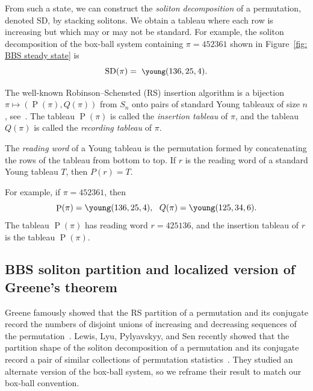 \documentclass[submission]{FPSAC2021}
\theoremstyle{plain}
\theoremstyle{definition}
\numberwithin{equation}{section}
\DeclareMathOperator{\SDself}{SD}
\DeclareMathOperator{\Ptself}{P}
\newcommand{\SD}[1]{\SDself(#1)}
\renewcommand{\P}[1]{\Ptself(#1)}
\begin{document}
From such a state, 
we can construct 
the \emph{soliton decomposition} of a permutation, denoted SD, 
by stacking solitons.
We obtain a tableau where each row is increasing but which may or may not be standard. 
For example, the  soliton decomposition of the box-ball system containing  $\pi=452361$ shown in Figure~\ref{fig: BBS steady state} is \[
{\small  \SD{\pi}=
    ~
    \young(136,25,4)}. 
    \]

\par The well-known Robinson--Schensted (RS) insertion algorithm is 
a bijection \\
${\pi \mapsto (\P{\pi},Q(\pi))}$
from $S_n$ onto pairs of standard Young tableaux of size $n$, see~\cite{Sch61}.
The tableau $\P{\pi}$ is called the \emph{insertion tableau} of $\pi$, and the tableau $Q(\pi)$ is called the \emph{recording tableau} of $\pi$. 

The \emph{reading word} of a %
Young tableau is the permutation formed by concatenating the rows of the tableau from bottom to top. 
If $r$ is the reading word of a standard Young tableau $T$, then $P(r)=T$. 

For example, 
if $\pi=452361$, then 
\[
\P{\pi}=\young(136,25,4), 
~~
Q(\pi)=\young(125,34,6).
\]
The tableau  {$\P{\pi}$} 
has reading word $r=425136$, and
the insertion tableau of $r$ is the tableau $\P{\pi}$. 


\subsection{BBS soliton partition and localized version of  Greene's theorem}
\label{sec:local Greene's theorem}
\label{sec: BBS soliton proofs}

 Greene famously 
showed that the RS partition of a permutation and its conjugate record the numbers of disjoint unions of increasing and decreasing  sequences of the permutation~\cite[Theorem ~3.1]{Gre74}.  
 Lewis, Lyu, Pylyavskyy, and Sen recently 
showed that 
the partition shape of the soliton decomposition 
 of a permutation and its conjugate 
record 
a pair of similar collections of permutation statistics~\cite[Lemma 2.1]{LLPS19}. 
They studied an alternate version of the box-ball system, so we reframe their result to match our box-ball convention.
\end{document}
